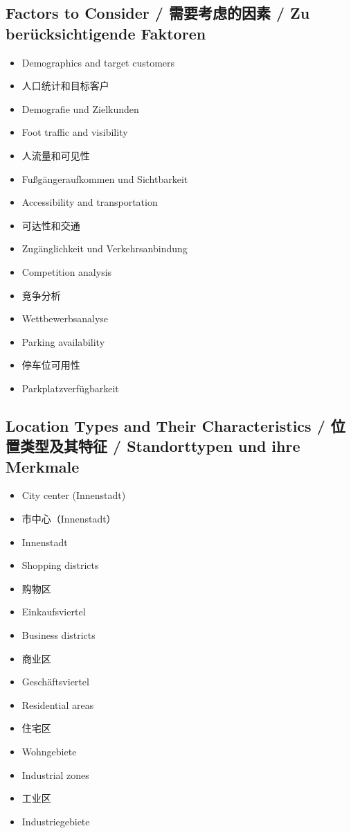 \subsection{Factors to Consider / 需要考虑的因素 / Zu berücksichtigende Faktoren}
\begin{itemize}
    \item Demographics and target customers
    \item 人口统计和目标客户
    \item Demografie und Zielkunden
    \item Foot traffic and visibility
    \item 人流量和可见性
    \item Fußgängeraufkommen und Sichtbarkeit
    \item Accessibility and transportation
    \item 可达性和交通
    \item Zugänglichkeit und Verkehrsanbindung
    \item Competition analysis
    \item 竞争分析
    \item Wettbewerbsanalyse
    \item Parking availability
    \item 停车位可用性
    \item Parkplatzverfügbarkeit
\end{itemize}

\subsection{Location Types and Their Characteristics / 位置类型及其特征 / Standorttypen und ihre Merkmale}
\begin{itemize}
    \item City center (Innenstadt)
    \item 市中心（Innenstadt）
    \item Innenstadt
    \item Shopping districts
    \item 购物区
    \item Einkaufsviertel
    \item Business districts
    \item 商业区
    \item Geschäftsviertel
    \item Residential areas
    \item 住宅区
    \item Wohngebiete
    \item Industrial zones
    \item 工业区
    \item Industriegebiete
\end{itemize}

